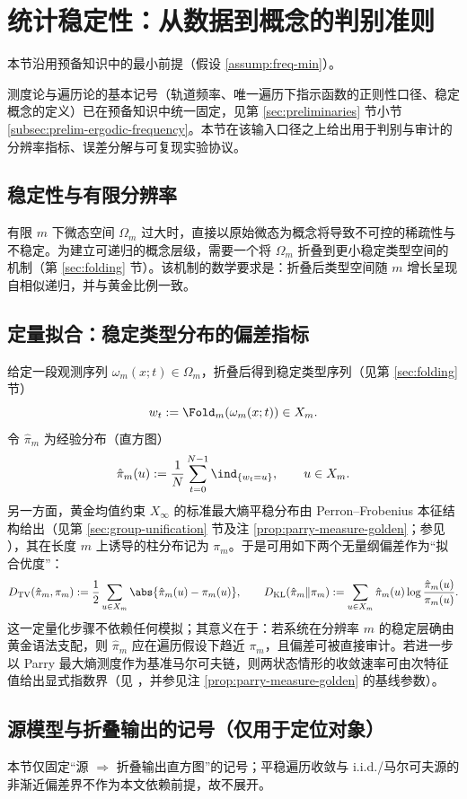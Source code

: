 \section{统计稳定性：从数据到概念的判别准则}\label{sec:statistical-stability}

本节沿用预备知识中的最小前提（假设 \ref{assump:freq-min}）。
\par
测度论与遍历论的基本记号（轨道频率、唯一遍历下指示函数的正则性口径、稳定概念的定义）已在预备知识中统一固定，见第 \ref{sec:preliminaries} 节小节 \ref{subsec:prelim-ergodic-frequency}。本节在该输入口径之上给出用于判别与审计的分辨率指标、误差分解与可复现实验协议。

\subsection{稳定性与有限分辨率}

有限 $m$ 下微态空间 $\Omega_m$ 过大时，直接以原始微态为概念将导致不可控的稀疏性与不稳定。为建立可递归的概念层级，需要一个将 $\Omega_m$ 折叠到更小稳定类型空间的机制（第 \ref{sec:folding} 节）。该机制的数学要求是：折叠后类型空间随 $m$ 增长呈现自相似递归，并与黄金比例一致。

\subsection{定量拟合：稳定类型分布的偏差指标}\label{sec:quant-fit}
给定一段观测序列 $\omega_m(x;t)\in\Omega_m$，折叠后得到稳定类型序列（见第 \ref{sec:folding} 节）
\[
w_t:=\Fold_m(\omega_m(x;t))\in X_m.
\]
令 $\hat{\pi}_m$ 为经验分布（直方图）
\[
\hat{\pi}_m(u):=\frac{1}{N}\sum_{t=0}^{N-1}\ind_{\{w_t=u\}},\qquad u\in X_m.
\]
另一方面，黄金均值约束 $X_\infty$ 的标准最大熵平稳分布由 Perron--Frobenius 本征结构给出（见第 \ref{sec:group-unification} 节及注 \ref{prop:parry-measure-golden}；参见 \cite{LindMarcus1995}），其在长度 $m$ 上诱导的柱分布记为 $\pi_m$。于是可用如下两个无量纲偏差作为“拟合优度”：
\[
D_{\mathrm{TV}}(\hat{\pi}_m,\pi_m):=\frac12\sum_{u\in X_m}\abs{\hat{\pi}_m(u)-\pi_m(u)},\qquad
D_{\mathrm{KL}}(\hat{\pi}_m\|\pi_m):=\sum_{u\in X_m}\hat{\pi}_m(u)\log\frac{\hat{\pi}_m(u)}{\pi_m(u)}.
\]
这一定量化步骤不依赖任何模拟；其意义在于：若系统在分辨率 $m$ 的稳定层确由黄金语法支配，则 $\hat{\pi}_m$ 应在遍历假设下趋近 $\pi_m$，且偏差可被直接审计。若进一步以 Parry 最大熵测度作为基准马尔可夫链，则两状态情形的收敛速率可由次特征值给出显式指数界（见 \cite{LindMarcus1995}，并参见注 \ref{prop:parry-measure-golden} 的基线参数）。

\subsection{源模型与折叠输出的记号（仅用于定位对象）}\label{subsec:histogram-convergence-natural-sources}
本节仅固定“源 $\Rightarrow$ 折叠输出直方图”的记号；平稳遍历收敛与 i.i.d./马尔可夫源的非渐近偏差界不作为本文依赖前提，故不展开。

